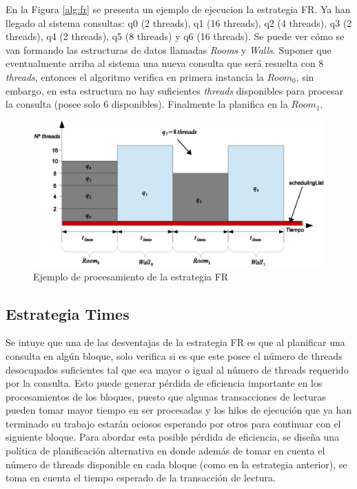En la Figura \ref{alg:fr} se presenta un ejemplo de ejecucion la estrategia FR. Ya han llegado al sistema consultas: q0 (2 threads), q1 (16 threads), q2 (4 threads), q3 (2 threads), q4 (2 threads), q5 (8 threads) y q6 (16 threads). Se puede ver cómo se van formando las estructuras de datos llamadas \textit{Rooms} y \textit{Walls}. Suponer que eventualmente arriba al sistema una nueva consulta que será resuelta con 8 \textit{threads}, entonces el algoritmo verifica en primera instancia la $Room_0$, sin embargo, en esta estructura no hay suficientes \textit{threads} disponibles para procesar la consulta (posee solo 6 disponibles). Finalmente la planifica en la $Room_1$.

\begin{figure}[!th]
\centering
\includegraphics[scale=.75]{images/proceso_FR.eps}
\caption{Ejemplo de procesamiento de la estrategia FR}
\label{fig:proceso_FR}
\end{figure} 

\subsection{Estrategia Times}
\label{scheduling:times}
Se intuye que una de las desventajas de la estrategia FR es que al planificar una consulta en algún bloque, solo verifica si es que este posee el número de threads desocupados suficientes tal que sea mayor o igual al número de threads requerido por la consulta. Esto puede generar pérdida de eficiencia importante en los procesamientos de los bloques, puesto que algunas transacciones de lecturas pueden tomar mayor tiempo en ser procesadas y los hilos de ejecución que ya han terminado su trabajo estarán ociosos esperando por otros para continuar con el siguiente bloque. Para abordar esta posible pérdida de eficiencia, se diseña una política de planificación alternativa en donde además de tomar en cuenta el número de threads disponible en cada bloque (como en la estrategia anterior), se toma en cuenta el tiempo esperado de la transacción de lectura.

